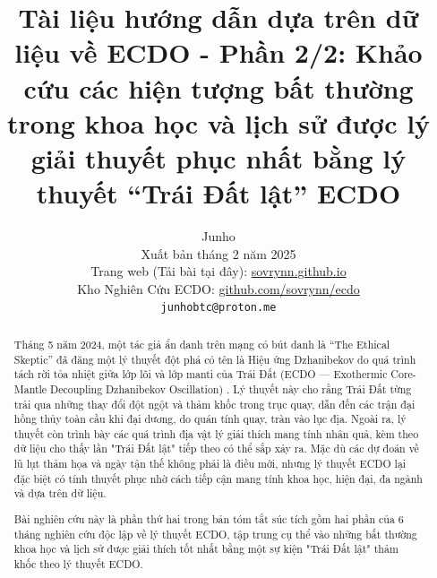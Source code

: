 \documentclass[10pt,twocolumn,letterpaper]{article}
\begin{document}
\title{Tài liệu hướng dẫn dựa trên dữ liệu về ECDO - Phần 2/2: Khảo cứu các hiện tượng bất thường trong khoa học và lịch sử được lý giải thuyết phục nhất bằng lý thuyết “Trái Đất lật” ECDO}

\author{Junho\\
Xuất bản tháng 2 năm 2025\\
Trang web (Tải bài tại đây): \href{https://sovrynn.github.io}{sovrynn.github.io}\\
Kho Nghiên Cứu ECDO: \href{https://github.com/sovrynn/ecdo}{github.com/sovrynn/ecdo}\\
{\tt\small junhobtc@proton.me}
}

\maketitle

\begin{abstract}
Tháng 5 năm 2024, một tác giả ẩn danh trên mạng có bút danh là “The Ethical Skeptic” \cite{0} đã đăng một lý thuyết đột phá có tên là Hiệu ứng Dzhanibekov do quá trình tách rời tỏa nhiệt giữa lớp lõi và lớp manti của Trái Đất (ECDO — Exothermic Core-Mantle Decoupling Dzhanibekov Oscillation) \cite{1}. Lý thuyết này cho rằng Trái Đất từng trải qua những thay đổi đột ngột và thảm khốc trong trục quay, dẫn đến các trận đại hồng thủy toàn cầu khi đại dương, do quán tính quay, tràn vào lục địa. Ngoài ra, lý thuyết còn trình bày các quá trình địa vật lý giải thích mang tính nhân quả, kèm theo dữ liệu cho thấy lần "Trái Đất lật" tiếp theo có thể sắp xảy ra. Mặc dù các dự đoán về lũ lụt thảm họa và ngày tận thế không phải là điều mới, nhưng lý thuyết ECDO lại đặc biệt có tính thuyết phục nhờ cách tiếp cận mang tính khoa học, hiện đại, đa ngành và dựa trên dữ liệu.

Bài nghiên cứu này là phần thứ hai trong bản tóm tắt súc tích gồm hai phần của 6 tháng nghiên cứu độc lập \cite{2,20} về lý thuyết ECDO, tập trung cụ thể vào những bất thường khoa học và lịch sử được giải thích tốt nhất bằng một sự kiện "Trái Đất lật" thảm khốc theo lý thuyết ECDO.

\end{abstract}
\end{document}
